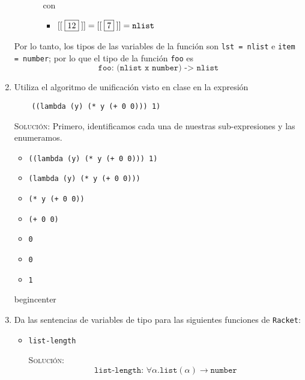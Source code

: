 \documentclass[letterpaper,11pt]{article}
\begin{document}
\begin{enumerate}
\begin{itemize}
\begin{itemize}
            con 
            \begin{itemize}
                \item $[[\;\fbox{12}\;]] = [[\;\fbox{7}\;]] = \texttt{nlist}$
            \end{itemize}
        \end{itemize}
    \end{itemize}

    Por lo tanto, los tipos de las variables de la función son \texttt{lst = nlist}
    e \texttt{item = number}; por lo que el tipo de la función \texttt{foo} es 
    \begin{equation*}
        \texttt{foo: (nlist x number) -> nlist}
    \end{equation*}

    \item Utiliza el algoritmo de unificación visto en clase en la expresión
    \begin{verbatim}
    ((lambda (y) (* y (+ 0 0))) 1)
    \end{verbatim}

    \textsc{Solución:} Primero, identificamos cada una de nuestras 
    sub-expresiones y las enumeramos.
    \begin{itemize}
        \item {} \texttt{((lambda (y) (* y (+ 0 0))) 1)}
        \item {} \texttt{(lambda (y) (* y (+ 0 0)))}
        \item {} \texttt{(* y (+ 0 0))}
        \item {} \texttt{(+ 0 0)}
        \item {} \texttt{0}
        \item {} \texttt{0}
        \item {} \texttt{1}
    \end{itemize}

    begin{center}


    \item Da las sentencias de variables de tipo para las siguientes funciones 
    de \texttt{Racket}:
    \begin{itemize}
        \item \texttt{list-length}

        \textsc{Solución:}
        \begin{equation*}
            \texttt{list-length: }\forall \alpha. \texttt{list}(\alpha) 
        \rightarrow \texttt{number}
        \end{equation*}


\end{itemize}
\end{enumerate}
\end{document}

